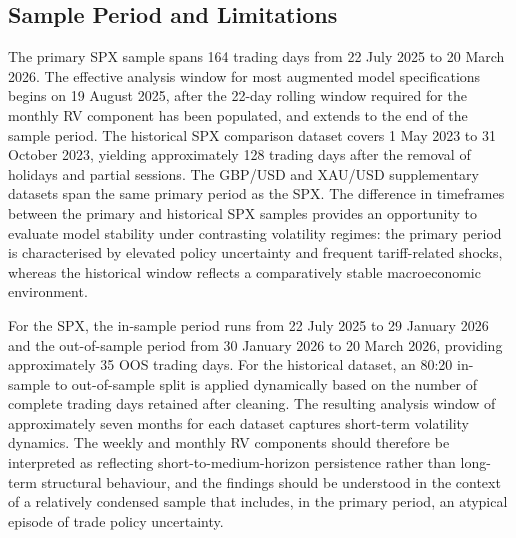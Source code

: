 \subsection{Sample Period and Limitations}

The primary SPX sample spans 164 trading days from 22 July 2025 to 20 March 2026. The effective analysis window for most augmented model specifications begins on 19 August 2025, after the 22-day rolling window required for the monthly RV component has been populated, and extends to the end of the sample period. The historical SPX comparison dataset covers 1 May 2023 to 31 October 2023, yielding approximately 128 trading days after the removal of holidays and partial sessions. The GBP/USD and XAU/USD supplementary datasets span the same primary period as the SPX. The difference in timeframes between the primary and historical SPX samples provides an opportunity to evaluate model stability under contrasting volatility regimes: the primary period is characterised by elevated policy uncertainty and frequent tariff-related shocks, whereas the historical window reflects a comparatively stable macroeconomic environment.

For the SPX, the in-sample period runs from 22 July 2025 to 29 January 2026 and the out-of-sample period from 30 January 2026 to 20 March 2026, providing approximately 35 OOS trading days. For the historical dataset, an 80:20 in-sample to out-of-sample split is applied dynamically based on the number of complete trading days retained after cleaning. The resulting analysis window of approximately seven months for each dataset captures short-term volatility dynamics. The weekly and monthly RV components should therefore be interpreted as reflecting short-to-medium-horizon persistence rather than long-term structural behaviour, and the findings should be understood in the context of a relatively condensed sample that includes, in the primary period, an atypical episode of trade policy uncertainty.

